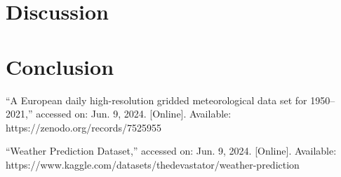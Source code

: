 \documentclass[conference]{IEEEtran}
\begin{document}
\section{Discussion}

\section{Conclusion}



\begin{thebibliography}{1}

``A European daily high-resolution gridded meteorological data set for 1950–2021,'' accessed on: Jun. 9, 2024. [Online]. Available: https://zenodo.org/records/7525955

``Weather Prediction Dataset,'' accessed on: Jun. 9, 2024. [Online]. Available: https://www.kaggle.com/datasets/thedevastator/weather-prediction

\end{thebibliography}
\end{document}
